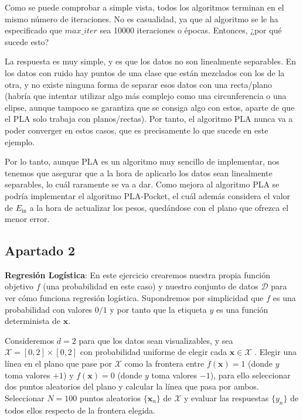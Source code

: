 \documentclass[11pt,a4paper]{article}
\newcommand{\ein}{$E_{\text{in}}$}
\begin{document}
Como se puede comprobar a simple vista, todos los algoritmos terminan en el mismo número de
iteraciones. No es casualidad, ya que al algoritmo se le ha especificado que $max\_iter$ sea
10000 iteraciones o épocas. Entonces, ¿por qué sucede esto?

La respuesta es muy simple, y es que los datos no son linealmente separables. En los datos con ruido
hay puntos de una clase que están mezclados con los de la otra, y no existe ninguna forma de
separar esos datos con una recta/plano (habría que intentar utilizar algo más complejo como una
circunferencia o una elipse, aunque tampoco se garantiza que se consiga algo con estos, aparte de
que el PLA solo trabaja con planos/rectas). Por tanto, el algoritmo PLA nunca va a poder converger en
estos casos, que es precisamente lo que sucede en este ejemplo.

Por lo tanto, aunque PLA es un algoritmo muy sencillo de implementar, nos tenemos que asegurar que a
la hora de aplicarlo los datos sean linealmente separables, lo cuál raramente se va a dar. Como mejora
al algoritmo PLA se podría implementar el algoritmo PLA-Pocket, el cuál además considera el valor de
\ein{} a la hora de actualizar los pesos, quedándose con el plano que ofrezca el menor error.

\subsection*{Apartado 2}

\noindent \textbf{Regresión Logística}: En este ejercicio crearemos nuestra propia función
objetivo $f$ (una probabilidad en este caso) y nuestro conjunto de datos $\mathcal{D}$ para ver cómo
funciona regresión logística. Supondremos por simplicidad que $f$ es una probabilidad con
valores $0/1$ y por tanto que la etiqueta $y$ es una función determinista de $\mathbf{x}$.

\noindent Consideremos $d = 2$ para que los datos sean visualizables, y sea
$\mathcal{X} = [0, 2] \times [0, 2]$ con probabilidad uniforme de elegir cada
$\mathbf{x} \in \mathcal{X}$ . Elegir una línea en el plano que pase por $\mathcal{X}$
como la frontera entre $f(\mathbf{x}) = 1$ (donde $y$ toma valores $+1$) y $f(\mathbf{x}) = 0$
(donde $y$ toma valores $-1$), para ello seleccionar dos puntos aleatorios del plano y calcular la
línea que pasa por ambos. Seleccionar $N = 100$ puntos aleatorios $\lbrace \mathbf{x}_n \rbrace$
de $\mathcal{X}$ y evaluar las respuestas $\lbrace y_n \rbrace$ de todos ellos respecto de la frontera
elegida.
\end{document}
